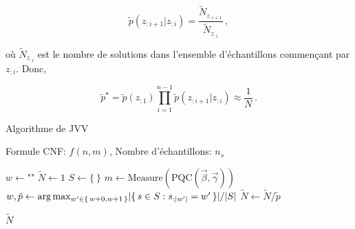 \begin{equation}
    \tilde p(z_{:i+1}|z_{:i}) = \frac{ \tilde N_{z_{:i+1}} }{ \tilde N_{z_{:i}} } \,,
\end{equation}

où $\tilde{N}_{z_{:i}}$ est le nombre de solutions dans l'ensemble d'échantillons commençant par $z_{:i}$. Donc,

\begin{equation}
    \tilde p^\star = \tilde p(z_{:1}) \prod_{i=1}^{n-1} \tilde p(z_{:i+1}|z_{:i}) \approx \frac1N \,.
\end{equation}



\begin{algorithm}[hb!]
    \caption{Algorithme de JVV}\label{alg:algorithme-jvv}
    \begin{algorithmic}[1]
    \REQUIRE Formule CNF: $f(n, m)$, Nombre d'échantillons: $n_{s}$

    \STATE $w \leftarrow \texttt{""}$ 
    \STATE $\tilde{N} \leftarrow 1$
    \STATE $S \leftarrow \{ \ \}$
    \STATE $m \leftarrow \text{Measure}(\text{PQC}(\vec{\beta}, \vec{\gamma}))$
    \ENDWHILE
    \STATE $w, \tilde{p} \leftarrow \arg \max_{w' \in \set{ w + 0, w + 1 }} \lvert \set{ s \in S : s_{:\lvert w' \rvert } = w' } \rvert / \lvert S \rvert$
    \STATE $\tilde{N} \leftarrow \tilde{N} / \tilde{p}$
    \ENDFOR
    
    \RETURN $\tilde{N}$
\end{algorithmic}
\end{algorithm}
